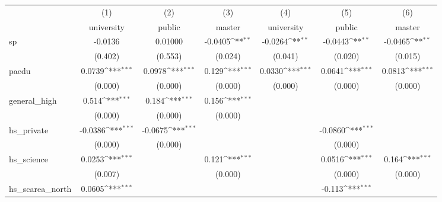 {
\def\sym#1{\ifmmode^{#1}\else\(^{#1}\)\fi}
\begin{tabular}{l*{6}{c}}
\hline\hline
            &\multicolumn{1}{c}{(1)}&\multicolumn{1}{c}{(2)}&\multicolumn{1}{c}{(3)}&\multicolumn{1}{c}{(4)}&\multicolumn{1}{c}{(5)}&\multicolumn{1}{c}{(6)}\\
            &\multicolumn{1}{c}{university}&\multicolumn{1}{c}{public}&\multicolumn{1}{c}{master}&\multicolumn{1}{c}{university}&\multicolumn{1}{c}{public}&\multicolumn{1}{c}{master}\\
\hline
sp          &     -0.0136         &     0.01000         &     -0.0405\sym{**} &     -0.0264\sym{**} &     -0.0443\sym{**} &     -0.0465\sym{**} \\
            &     (0.402)         &     (0.553)         &     (0.024)         &     (0.041)         &     (0.020)         &     (0.015)         \\
[1em]
paedu       &      0.0739\sym{***}&      0.0978\sym{***}&       0.129\sym{***}&      0.0330\sym{***}&      0.0641\sym{***}&      0.0813\sym{***}\\
            &     (0.000)         &     (0.000)         &     (0.000)         &     (0.000)         &     (0.000)         &     (0.000)         \\
[1em]
general\_high&       0.514\sym{***}&       0.184\sym{***}&       0.156\sym{***}&                     &                     &                     \\
            &     (0.000)         &     (0.000)         &     (0.000)         &                     &                     &                     \\
[1em]
hs\_private  &     -0.0386\sym{***}&     -0.0675\sym{***}&                     &                     &     -0.0860\sym{***}&                     \\
            &     (0.000)         &     (0.000)         &                     &                     &     (0.000)         &                     \\
[1em]
hs\_science  &      0.0253\sym{***}&                     &       0.121\sym{***}&                     &      0.0516\sym{***}&       0.164\sym{***}\\
            &     (0.007)         &                     &     (0.000)         &                     &     (0.000)         &     (0.000)         \\
[1em]
hs\_scarea\_north&      0.0605\sym{***}&                     &                     &                     &      -0.113\sym{***}&                     \\

\end{tabular}}
